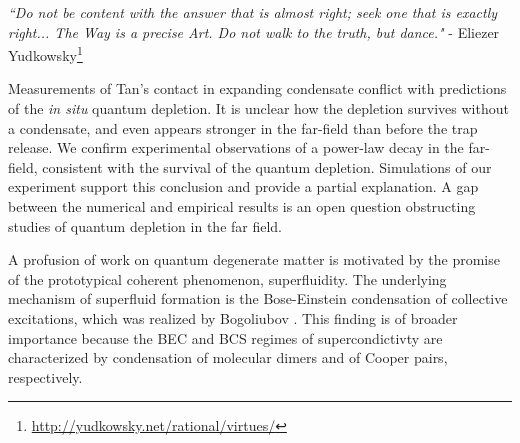 
\begin{adjustwidth}{3cm}{0cm}
\begin{flushright}
\emph{``Do not be content with the answer that is almost right; seek one that is exactly right... The Way is a precise Art. Do not walk to the truth, but dance."} - Eliezer Yudkowsky\footnote{\url{http://yudkowsky.net/rational/virtues/}}
\end{flushright}
\end{adjustwidth}




Measurements of Tan's contact in expanding condensate conflict with predictions of the \emph{in situ} quantum depletion. It is unclear how the depletion survives without a condensate, and even appears stronger in the far-field than before the trap release. We confirm experimental observations of a power-law decay in the far-field, consistent with the survival of the quantum depletion. Simulations of our experiment support this conclusion and provide a partial explanation. A gap between the numerical and empirical results is an open question obstructing studies of quantum depletion in the far field.


A profusion of work on quantum degenerate matter is motivated by the promise of the prototypical coherent phenomenon, superfluidity. The underlying mechanism of superfluid formation is the Bose-Einstein condensation of collective excitations, which was realized by Bogoliubov \cite{Bogolubov47}. This finding is of broader importance because the BEC and BCS regimes of supercondictivty are characterized by condensation of molecular dimers and of Cooper pairs, respectively. 

